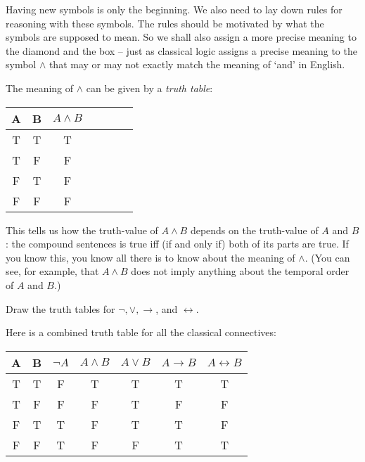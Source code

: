 
Having new symbols is only the beginning. We also need to lay down 
rules for reasoning with these symbols. The rules should be motivated by
what the symbols are supposed to mean. So we shall also assign a more precise
meaning to the diamond and the box -- just as classical logic assigns a precise
meaning to the symbol $\land$ that may or may not exactly match the meaning of
`and' in English.


The meaning of $\land$ can be given by a \emph{truth table}:
\begin{center}
  \begin{tabular}{cc|ccccc}
    A & B & $A \land B$ \\\hline
    T & T & T\\
    T & F & F\\
    F & T & F\\
    F & F & F
  \end{tabular}
\end{center}
This tells us how the truth-value of $A \land B$ depends on the truth-value of
$A$ and $B$: the compound sentences is true iff (if and only if) both of its
parts are true. If you know this, you know all there is to know about the
meaning of $\land$. (You can see, for example, that $A \land B$ does not imply
anything about the temporal order of $A$ and $B$.)

\begin{exercise}
  Draw the truth tables for $\neg, \lor, \to$, and $\leftrightarrow$.
\end{exercise}
\begin{solution}
  Here is a combined truth table for all the classical connectives: 
  \begin{center}
    \begin{tabular}{cc|ccccc}
      A & B & $\neg A$ & $A \land B$ & $A\lor B$ & $A\to B$ & $A\leftrightarrow B$\\\hline
      T & T & F & T & T & T & T\\
      T & F & F & F & T & F & F\\
      F & T & T & F & T & T & F\\
      F & F & T & F & F & T & T\\
    \end{tabular}
  \end{center}
\end{solution}


